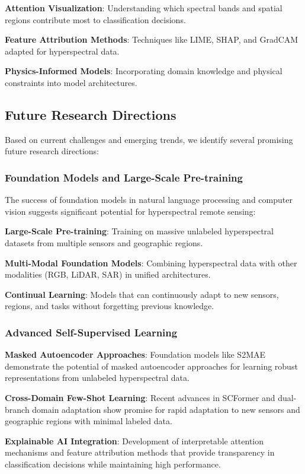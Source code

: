 \documentclass[journal]{IEEEtran}
\begin{document}
\textbf{Attention Visualization}: Understanding which spectral bands and spatial regions contribute most to classification decisions.

\textbf{Feature Attribution Methods}: Techniques like LIME, SHAP, and GradCAM adapted for hyperspectral data.

\textbf{Physics-Informed Models}: Incorporating domain knowledge and physical constraints into model architectures.

\subsection{Future Research Directions}

Based on current challenges and emerging trends, we identify several promising future research directions:

\subsubsection{Foundation Models and Large-Scale Pre-training}

The success of foundation models in natural language processing and computer vision suggests significant potential for hyperspectral remote sensing:

\textbf{Large-Scale Pre-training}: Training on massive unlabeled hyperspectral datasets from multiple sensors and geographic regions.

\textbf{Multi-Modal Foundation Models}: Combining hyperspectral data with other modalities (RGB, LiDAR, SAR) in unified architectures.

\textbf{Continual Learning}: Models that can continuously adapt to new sensors, regions, and tasks without forgetting previous knowledge.

\subsubsection{Advanced Self-Supervised Learning}

\textbf{Masked Autoencoder Approaches}: Foundation models like S2MAE demonstrate the potential of masked autoencoder approaches for learning robust representations from unlabeled hyperspectral data.

\textbf{Cross-Domain Few-Shot Learning}: Recent advances in SCFormer and dual-branch domain adaptation show promise for rapid adaptation to new sensors and geographic regions with minimal labeled data.

\textbf{Explainable AI Integration}: Development of interpretable attention mechanisms and feature attribution methods that provide transparency in classification decisions while maintaining high performance.
\end{document}
